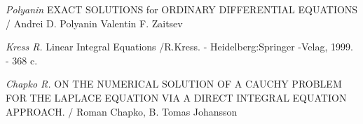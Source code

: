 \documentclass[a4 paper,12pt,ukrainian]{report}
\begin{document}
\renewcommand{\bibname}{Список літератури}
\begin{thebibliography}{99}

\emph{Polyanin} EXACT SOLUTIONS for ORDINARY DIFFERENTIAL EQUATIONS / Andrei D. Polyanin Valentin F. Zaitsev

\emph{Kress R.} Linear Integral Equations /R.Kress. - Heidelberg:Springer -Velag, 1999. - 368 c.

\emph{Chapko R.} ON THE NUMERICAL SOLUTION OF A CAUCHY PROBLEM FOR THE LAPLACE EQUATION VIA A DIRECT INTEGRAL EQUATION APPROACH. / Roman Chapko, B. Tomas Johansson 

\end{thebibliography}
\end{document}
